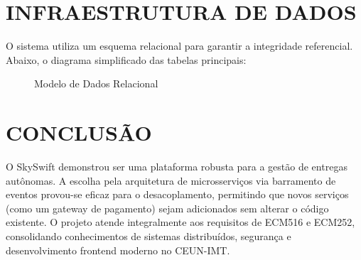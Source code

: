 \documentclass[12pt,a4paper]{article}
\begin{document}
\section{INFRAESTRUTURA DE DADOS}
O sistema utiliza um esquema relacional para garantir a integridade referencial. Abaixo, o diagrama simplificado das tabelas principais:

\begin{figure}[h]
    \centering
    \caption{Modelo de Dados Relacional}
\end{figure}

\section{CONCLUSÃO}
O SkySwift demonstrou ser uma plataforma robusta para a gestão de entregas autônomas. A escolha pela arquitetura de microsserviços via barramento de eventos provou-se eficaz para o desacoplamento, permitindo que novos serviços (como um gateway de pagamento) sejam adicionados sem alterar o código existente. O projeto atende integralmente aos requisitos de ECM516 e ECM252, consolidando conhecimentos de sistemas distribuídos, segurança e desenvolvimento frontend moderno no CEUN-IMT.
\end{document}
